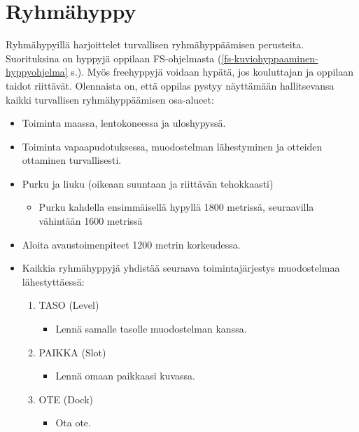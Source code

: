 \section{ Ryhmähyppy }
\label{jatkokoulutuksen-suoritukset-ryhmahyppy}


Ryhmähypyillä harjoittelet turvallisen ryhmähyppäämisen perusteita. Suorituksina on hyppyjä oppilaan FS-ohjelmasta (\ref{fs-kuviohyppaaminen-hyppyohjelma} s.\pageref{fs-kuviohyppaaminen-hyppyohjelma}). Myös freehyppyjä voidaan hypätä, jos kouluttajan ja oppilaan taidot riittävät. Olennaista on, että oppilas pystyy näyttämään hallitsevansa kaikki turvallisen ryhmähyppäämisen osa-alueet: 

\begin{itemize}
\item  Toiminta maassa, lentokoneessa ja uloshypyssä. 
\item  Toiminta vapaapudotuksessa, muodostelman lähestyminen ja otteiden ottaminen turvallisesti. 
\item  Purku ja liuku (oikeaan suuntaan ja riittävän tehokkaasti) 
	\begin{itemize}
	\item Purku kahdella ensimmäisellä hypyllä 1800 metrissä, seuraavilla vähintään 1600 metrissä 
	\end{itemize}
\item  Aloita avaustoimenpiteet 1200 metrin korkeudessa. 
\end{itemize}
\begin{itemize}
\item  Kaikkia ryhmähyppyjä yhdistää seuraava toimintajärjestys muodostelmaa lähestyttäessä: 
	\begin{enumerate}[label=\bfseries \arabic*)]
	\item TASO (Level) 
		\begin{itemize}
		\item Lennä samalle tasolle muodostelman kanssa. 
		\end{itemize}
	\item PAIKKA (Slot) 
		\begin{itemize}
		\item Lennä omaan paikkaasi kuvassa. 
		\end{itemize}
	\item OTE (Dock) 
		\begin{itemize}
		\item Ota ote. 
		\end{itemize}
	\end{enumerate}
\end{itemize}
